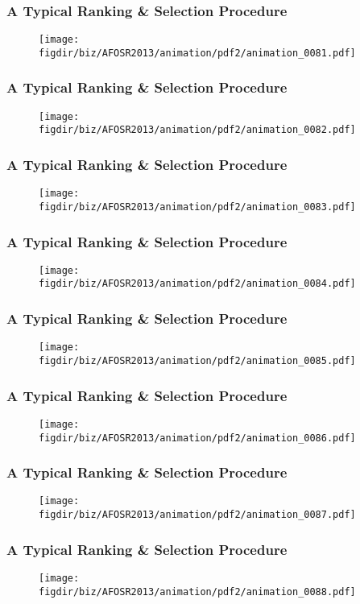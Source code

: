 \documentclass[13pt]{beamer}
\newcommand{\figdir}{../../fig}
\begin{document}
\begin{frame}\frametitle{A Typical Ranking \& Selection Procedure}\begin{figure}\texttt{[image: \\figdir/biz/AFOSR2013/animation/pdf2/animation\_0081.pdf]}\end{figure}\end{frame}
\begin{frame}\frametitle{A Typical Ranking \& Selection Procedure}\begin{figure}\texttt{[image: \\figdir/biz/AFOSR2013/animation/pdf2/animation\_0082.pdf]}\end{figure}\end{frame}
\begin{frame}\frametitle{A Typical Ranking \& Selection Procedure}\begin{figure}\texttt{[image: \\figdir/biz/AFOSR2013/animation/pdf2/animation\_0083.pdf]}\end{figure}\end{frame}
\begin{frame}\frametitle{A Typical Ranking \& Selection Procedure}\begin{figure}\texttt{[image: \\figdir/biz/AFOSR2013/animation/pdf2/animation\_0084.pdf]}\end{figure}\end{frame}
\begin{frame}\frametitle{A Typical Ranking \& Selection Procedure}\begin{figure}\texttt{[image: \\figdir/biz/AFOSR2013/animation/pdf2/animation\_0085.pdf]}\end{figure}\end{frame}
\begin{frame}\frametitle{A Typical Ranking \& Selection Procedure}\begin{figure}\texttt{[image: \\figdir/biz/AFOSR2013/animation/pdf2/animation\_0086.pdf]}\end{figure}\end{frame}
\begin{frame}\frametitle{A Typical Ranking \& Selection Procedure}\begin{figure}\texttt{[image: \\figdir/biz/AFOSR2013/animation/pdf2/animation\_0087.pdf]}\end{figure}\end{frame}
\begin{frame}\frametitle{A Typical Ranking \& Selection Procedure}\begin{figure}\texttt{[image: \\figdir/biz/AFOSR2013/animation/pdf2/animation\_0088.pdf]}\end{figure}\end{frame}
\end{document}
